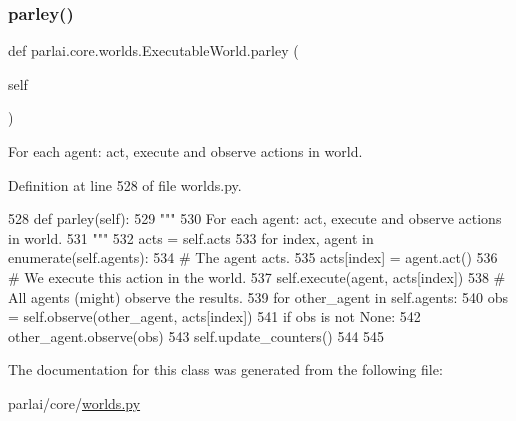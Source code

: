 \subsubsection{\texorpdfstring{parley()}{parley()}}
{\footnotesize\ttfamily def parlai.\+core.\+worlds.\+Executable\+World.\+parley (\begin{DoxyParamCaption}\item[{}]{self }\end{DoxyParamCaption})}

\begin{DoxyVerb}For each agent: act, execute and observe actions in world.
\end{DoxyVerb}
 

Definition at line 528 of file worlds.\+py.


\begin{DoxyCode}
528     \textcolor{keyword}{def }parley(self):
529         \textcolor{stringliteral}{"""}
530 \textcolor{stringliteral}{        For each agent: act, execute and observe actions in world.}
531 \textcolor{stringliteral}{        """}
532         acts = self.acts
533         \textcolor{keywordflow}{for} index, agent \textcolor{keywordflow}{in} enumerate(self.agents):
534             \textcolor{comment}{# The agent acts.}
535             acts[index] = agent.act()
536             \textcolor{comment}{# We execute this action in the world.}
537             self.execute(agent, acts[index])
538             \textcolor{comment}{# All agents (might) observe the results.}
539             \textcolor{keywordflow}{for} other\_agent \textcolor{keywordflow}{in} self.agents:
540                 obs = self.observe(other\_agent, acts[index])
541                 \textcolor{keywordflow}{if} obs \textcolor{keywordflow}{is} \textcolor{keywordflow}{not} \textcolor{keywordtype}{None}:
542                     other\_agent.observe(obs)
543         self.update\_counters()
544 
545 
\end{DoxyCode}


The documentation for this class was generated from the following file\+:\begin{DoxyCompactItemize}
\item 
parlai/core/\hyperlink{parlai_2core_2worlds_8py}{worlds.\+py}\end{DoxyCompactItemize}
